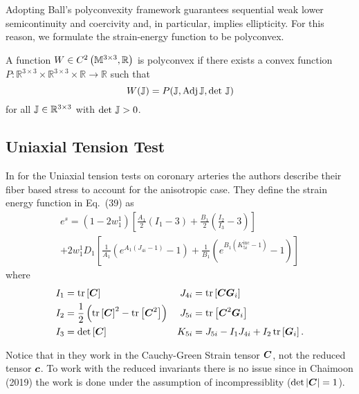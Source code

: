 \documentclass{article}
\begin{document}

Adopting Ball’s polyconvexity framework \cite{ball-1977} guarantees sequential weak lower semicontinuity and coercivity and, in particular, implies ellipticity. For this reason, we formulate the strain-energy function to be polyconvex.

\begin{definition}[Polyconvexity]
   A function $W\in C^2\left({\mathbb M}^{3\times 3}, {\mathbb R}\right)$ is polyconvex if there exists a convex function $P:\mathbb{R}^{3\times 3}\times\mathbb{R}^{3\times 3}\times\mathbb{R}\to\mathbb{R}$ such that
   \begin{equation}
      W({\mathbb J}) = P({\mathbb J}, \text{Adj}\,{\mathbb J}, \det\,{\mathbb J})
   \end{equation}
   for all ${\mathbb J}\in\mathbb{R}^{3\times 3}$ with $\det\,{\mathbb J} > 0$.
\end{definition}

\subsection{Uniaxial Tension Test}

In \cite[Sec.~4.1]{chaimoon2019} for the Uniaxial tension tests on coronary arteries the authors describe their fiber based stress to account for the anisotropic case.
They define the strain energy function in Eq.~(39) as
\begin{multline}
   \label{eqn:chaimoon-strain}
   e^s = \left(1-2w_1^1\right) \left[\frac{A_1}{2}\left(I_1-3\right) + \frac{B_1}{2}\left(\frac{I_2}{I_3}-3\right)\right] \\
   + 2w_1^1D_1 \left[\frac{1}{A_1}\left(e^{A_1\left(J_{4i}-1\right)}-1\right) + \frac{1}{B_1}\left(e^{B_1\left(K_{5i}^{\text{inc}}-1\right)} -1\right)\right]
\end{multline}
where
\begin{align*}
   I_1 &= \operatorname{tr}\left[{\boldsymbol C}\right] & J_{4i} &= \operatorname{tr}\left[{\boldsymbol C}{\boldsymbol G}_i\right] \\
   I_2 &= \frac{1}{2}\left(\operatorname{tr}\left[{\boldsymbol C}\right]^2 - \operatorname{tr}\left[{\boldsymbol C}^2\right]\right) & J_{5i} &= \operatorname{tr}\left[{\boldsymbol C}^2{\boldsymbol G}_i\right] \\
   I_3 &= \det\left[{\boldsymbol C}\right] & K_{5i} &= J_{5i} - I_1J_{4i} + I_2\operatorname{tr}\left[{\boldsymbol G}_i\right].
\end{align*}

\begin{remark}
   Notice that in \cite{chaimoon2019} they work in the Cauchy-Green Strain tensor ${\boldsymbol C}$, not the reduced tensor ${\boldsymbol c}$.
   To work with the reduced invariants there is no issue since in Chaimoon (2019) the work is done under the assumption of incompressiblity ($\det\left|{\boldsymbol C}\right| = 1$).
\end{remark}
\end{document}
